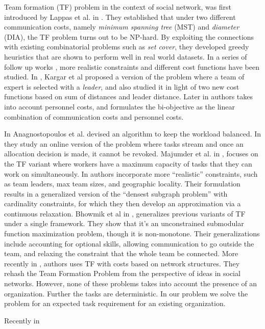 Team formation (TF) problem in the context of social network, was first introduced by Lappas et al. in \cite{lappas2009finding}. They established that under two different communication costs, namely \textit{minimum spanning tree} (MST) and \textit{diameter} (DIA), the TF problem turns out to be NP-hard. By exploiting the connections with existing combinatorial problems such as \textit{set cover}, they developed greedy heuristics that are shown to perform well in real world datasets. In a series of follow up works \cite{anagnostopoulos2010power,kargar2011discovering,anagnostopoulos2012online,majumder2012capacitated,kargar2012efficient,kargar2013finding}, more realistic constraints and different cost functions have been studied. In \cite{kargar2011discovering}, Kargar et al proposed a version of the problem where a team of expert is selected with a \textit{leader}, and also studied it in light of two new cost functions based on sum of distances and leader distance. Later in \cite{kargar2012efficient,kargar2013finding} authors takes into account personnel costs, and formulates the bi-objective as the linear combination of communication costs and personnel costs.

In \cite{anagnostopoulos2010power} Anagnostopoulos et al. devised an algorithm to keep the workload balanced. In \cite{anagnostopoulos2012online} they study an online version of the problem where tasks stream and once an allocation decision is made, it cannot be revoked. Majumder et al. in \cite{majumder2012capacitated}, focuses on the TF variant where workers have a maximum capacity of tasks that they can work on simultaneously. In \cite{rangapuram2013towards} authors incorporate more ``realistic'' constraints, such as team leaders, max team sizes, and geographic locality. Their formulation results in a generalized version of the ``densest subgraph problem'' with cardinality constraints, for which they then develop an approximation via a continuous relaxation. Bhowmik et al in \cite{bhowmik2014submodularity}, generalizes previous variants of TF under a single framework. They show that it's an unconstrained submodular function maximization problem, though it is non-monotone. Their generalizations include accounting for optional skills, allowing communication to go outside the team, and relaxing the constraint that the whole team be connected. More recently in \cite{farasat2016social}, authors uses TF with costs based on network structures. They rehash the Team Formation Problem from the perspective of ideas in social networks. However, none of these problems takes into account the presence of an organization. Further the tasks are deterministic. In our problem we solve the problem for an expected task requirement for an existing organization.

Recently in 


